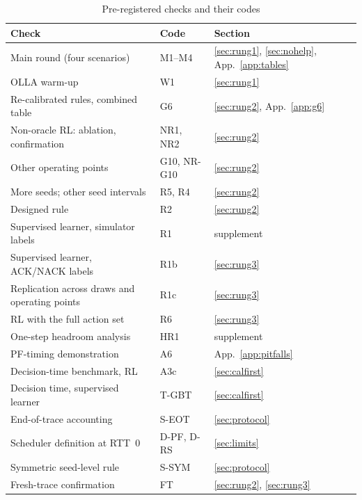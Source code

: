 \begin{table}[h]
\caption{Pre-registered checks and their codes}\label{tab:stages}
\centering\footnotesize
\setlength{\tabcolsep}{3pt}
\begin{tabular}{@{}p{4.3cm}p{1.6cm}p{1.8cm}@{}}
\toprule
Check & Code & Section\\
\midrule
Main round (four scenarios) & M1--M4 & \ref{sec:rung1}, \ref{sec:nohelp}, App.~\ref{app:tables}\\
OLLA warm-up & W1 & \ref{sec:rung1}\\
Re-calibrated rules, combined table & G6 & \ref{sec:rung2}, App.~\ref{app:g6}\\
Non-oracle RL: ablation, confirmation & NR1, NR2 & \ref{sec:rung2}\\
Other operating points & G10, NR-G10 & \ref{sec:rung2}\\
More seeds; other seed intervals & R5, R4 & \ref{sec:rung2}\\
Designed rule & R2 & \ref{sec:rung2}\\
Supervised learner, simulator labels & R1 & supplement\\
Supervised learner, ACK/NACK labels & R1b & \ref{sec:rung3}\\
Replication across draws and operating points & R1c & \ref{sec:rung3}\\
RL with the full action set & R6 & \ref{sec:rung3}\\
One-step headroom analysis & HR1 & supplement\\
PF-timing demonstration & A6 & App.~\ref{app:pitfalls}\\
Decision-time benchmark, RL & A3c & \ref{sec:calfirst}\\
Decision time, supervised learner & T-GBT & \ref{sec:calfirst}\\
End-of-trace accounting & S-EOT & \ref{sec:protocol}\\
Scheduler definition at RTT~0 & D-PF, D-RS & \ref{sec:limits}\\
Symmetric seed-level rule & S-SYM & \ref{sec:protocol}\\
Fresh-trace confirmation & FT & \ref{sec:rung2}, \ref{sec:rung3}\\
\bottomrule
\end{tabular}
\end{table}
